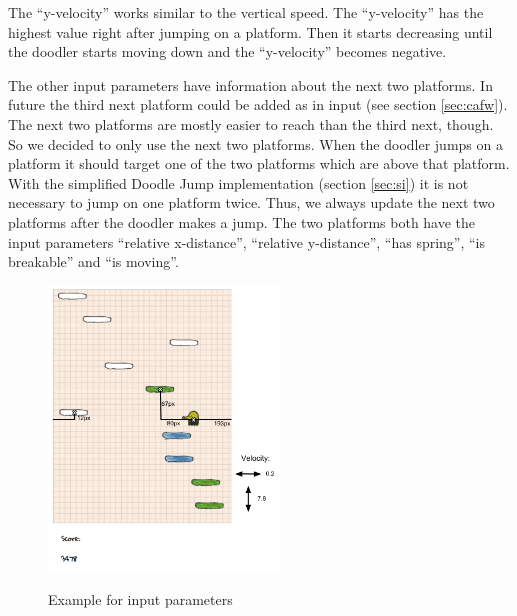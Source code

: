 \documentclass[a4paper,12pt,pagesize,headsepline,bibtotoc,titlepage,abstracton]{scrartcl}
\begin{document}
The ``y-velocity'' works similar to the vertical speed. The ``y-velocity'' has the highest value right after jumping on a platform. Then it starts decreasing until the doodler starts moving down and the ``y-velocity'' becomes negative.

The other input parameters have information about the next two platforms. In future the third next platform could be added as in input (see section \ref{sec:cafw}). The next two platforms are mostly easier to reach than the third next, though. So we decided to only use the next two platforms. When the doodler jumps on a platform it should target one of the two platforms which are above that platform. With the simplified Doodle Jump implementation (section \ref{sec:si}) it is not necessary to jump on one platform twice. Thus, we always update the next two platforms after the doodler makes a jump. The two platforms both have the input parameters ``relative x-distance'', ``relative y-distance'', ``has spring'', ``is breakable'' and ``is moving''.

\begin{figure}[h]
\begin{center}
\includegraphics*[width=0.55\textwidth]{images/input}\\
\caption{Example for input parameters}
\label{abb:ip}
\end{center}
\end{figure}
\end{document}
